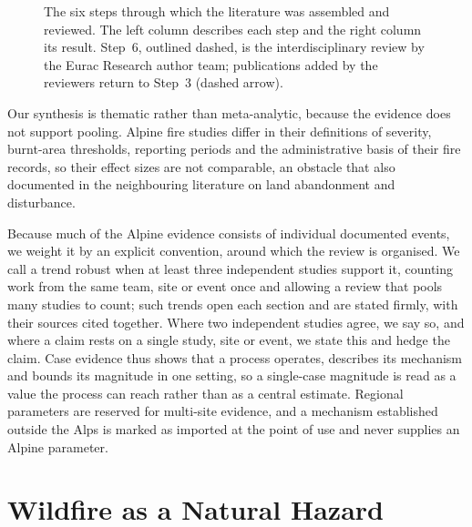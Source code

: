 \documentclass[11pt,a4paper]{article}
\begin{document}
\begin{figure}[H]
\caption{The six steps through which the literature was assembled and reviewed. The left column describes each step and the right column its result. Step~6, outlined dashed, is the interdisciplinary review by the Eurac Research author team; publications added by the reviewers return to Step~3 (dashed arrow).}
\label{fig:flow}
\end{figure}

Our synthesis is thematic rather than meta-analytic, because the evidence does not support pooling. Alpine fire studies differ in their definitions of severity, burnt-area thresholds, reporting periods and the administrative basis of their fire records, so their effect sizes are not comparable, an obstacle that \citet{mantero_influence_2020} also documented in the neighbouring literature on land abandonment and disturbance.

Because much of the Alpine evidence consists of individual documented events, we weight it by an explicit convention, around which the review is organised. We call a trend robust when at least three independent studies support it, counting work from the same team, site or event once and allowing a review that pools many studies to count; such trends open each section and are stated firmly, with their sources cited together. Where two independent studies agree, we say so, and where a claim rests on a single study, site or event, we state this and hedge the claim. Case evidence thus shows that a process operates, describes its mechanism and bounds its magnitude in one setting, so a single-case magnitude is read as a value the process can reach rather than as a central estimate. Regional parameters are reserved for multi-site evidence, and a mechanism established outside the Alps is marked as imported at the point of use and never supplies an Alpine parameter.

\section{Wildfire as a Natural Hazard}
\label{sec:hazard}
\end{document}
